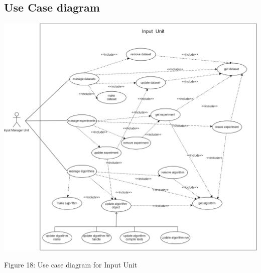 \subsection{Use Case diagram}
   \includegraphics[width=\textwidth]{input_unit/images/input_unit_use_case.png}
    \begin{center}
    	\small{Figure 18: Use case diagram for Input Unit}
    \end{center}